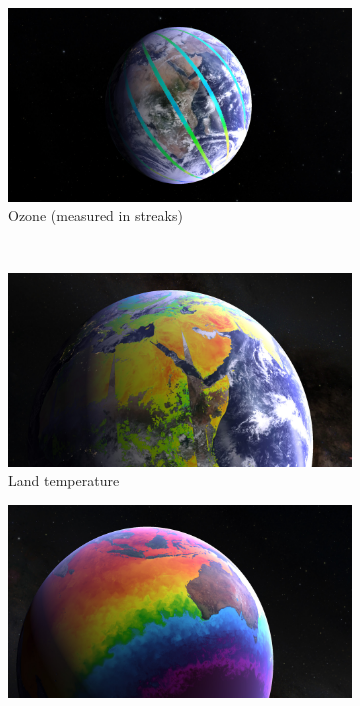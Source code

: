 \begin{figure}[h]
    \centering
    \begin{subfigure}[t]{0.45\textwidth}
        \includegraphics[width=\textwidth]{figures/results/screenshots_science_params/ozone.jpg}
        \caption{Ozone (measured in streaks)}
    \end{subfigure}
    ~
    \begin{subfigure}[t]{0.45\textwidth}
        \includegraphics[width=\textwidth]{figures/results/screenshots_science_params/land_temp.jpg}
        \caption{Land temperature}
    \end{subfigure}
    \par\bigskip
    \begin{subfigure}[t]{0.90\textwidth}
        \includegraphics[width=\textwidth]{figures/results/screenshots_science_params/sea_surface.jpg}

\end{subfigure}
\end{figure}
